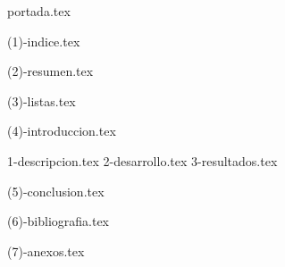 \documentclass[12pt, letterpaper, table, xcdraw]{inf-pucv}
\begin{document}
  {portada.tex}
  \clearpage

  {(1)-indice.tex}
  \clearpage
  
  {(2)-resumen.tex}
  \clearpage

  {(3)-listas.tex}
  \clearpage
  
  {(4)-introduccion.tex}
  \clearpage

  {1-descripcion.tex}
  \clearpage
  {2-desarrollo.tex}
  \clearpage
  {3-resultados.tex}
  \clearpage
  
  {(5)-conclusion.tex}
  \clearpage
  
  {(6)-bibliografia.tex}
  \clearpage
  
  {(7)-anexos.tex}
\end{document}
